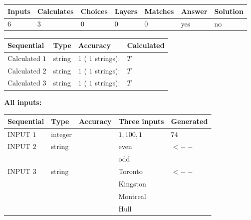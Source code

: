 \documentclass[12pt]{article}
\begin{document}
   
\noindent\begin{tabular}{|l|l|l|l|l|l|l|}
 \hline
Inputs & Calculates & Choices & Layers & Matches & Answer & Solution \\ \hline
           6  & 
           3  & 
           0
  & 
           0  & 
           0  & 
  yes & 
  no 
  \\ \hline
 \end{tabular}
   
   
   
   
\noindent{}
   
   
  
  
\noindent\begin{tabular}{|l|l|l|l|}
\hline
 Sequential & Type & Accuracy & Calculated \\ 
\hline
 
 
  Calculated $            1 $ & string & $            1  $ ( $           1  $ strings): 
 & $T$
 \\  \hline  
 
 
  Calculated $            2 $ & string & $            1  $ ( $           1  $ strings): 
 & $T$
 \\  \hline  
 
 
  Calculated $            3 $ & string & $            1  $ ( $           1  $ strings): 
 & $T$
 \\  \hline  
 \end{tabular}
   
   
   
   
\noindent\vspace{0.1in}\hspace{-0.08in} {\textbf{\Large{All inputs: }}}
   
   
  
  
\noindent\begin{tabular}{|l|l|l|l|l|}
\hline
 Sequential & Type & Accuracy & Three inputs & Generated \\ 
\hline
 
 
  INPUT $            1 $ & integer &  & $
 1
 , 
 100
 , 
 1
 $ & $ 74 $ 
 \\  \hline  
 
 
  INPUT $            2 $ & string & & 
 even & 
  $ <-- $ 
  \\
  & & & 
 odd & 
 \\  \hline  
 
 
  INPUT $            3 $ & string & & 
 Toronto & 
  $ <-- $ 
  \\
  & & & 
 Kingston & 
  \\
  & & & 
 Montreal & 
  \\
  & & & 
 Hull & 
 \\  \hline  
 \end{tabular}
   
\end{document}
